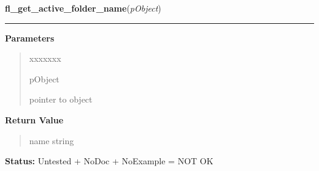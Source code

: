 \hspace{.8\funcindent}\begin{boxedminipage}{\funcwidth}

    \raggedright \textbf{fl\_get\_active\_folder\_name}(\textit{pObject})

    \vspace{-1.5ex}

    \rule{\textwidth}{0.5\fboxrule}
\setlength{\parskip}{2ex}
\setlength{\parskip}{1ex}
      \textbf{Parameters}
      \vspace{-1ex}

      \begin{quote}
        \begin{Ventry}{xxxxxxx}

          \item[pObject]

          pointer to object

        \end{Ventry}

      \end{quote}

      \textbf{Return Value}
    \vspace{-1ex}

      \begin{quote}
      name string

      \end{quote}

\textbf{Status:} Untested + NoDoc + NoExample = NOT OK



    \end{boxedminipage}

    \label{xformslib:library:fl_get_folder_area}

    \vspace{0.5ex}

